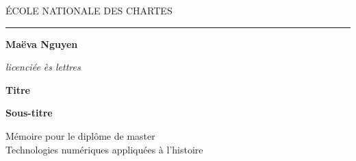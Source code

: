 \begin{titlepage}
	\begin{center}
		
		\bigskip
		
		\begin{large}
			ÉCOLE NATIONALE DES CHARTES
		\end{large}
		\begin{center}\rule{2cm}{0.02cm}\end{center}
		
		\bigskip
		\bigskip
		\bigskip
		\begin{Large}
			\textbf{Maëva Nguyen}\\
		\end{Large}
		\begin{normalsize} \textit{licenciée ès lettres}\\
		\end{normalsize}
		
		\bigskip
		\bigskip
		\bigskip
		
		\begin{Huge}
			\textbf{Titre}\\
		\end{Huge}
		\bigskip
		\bigskip
		\begin{LARGE}
			\textbf{Sous-titre}\\
		\end{LARGE}
		
		\bigskip
		\bigskip
		\bigskip
		\begin{large}
		\end{large}
		\vfill
		
		\begin{large}
			Mémoire 
			pour le diplôme de master \\
			\og Technologies numériques appliquées à l'histoire~\fg\\
		\end{large}
		
	\end{center}
\end{titlepage}